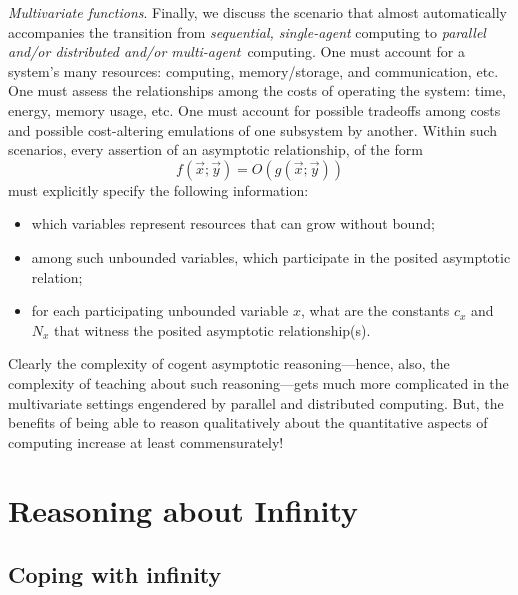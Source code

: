 {\em Multivariate functions}.
Finally, we discuss the scenario that almost automatically accompanies the transition from {\em sequential, single-agent} computing to {\em parallel and/or distributed and/or multi-agent}~computing.  One must account for a system's many resources: computing, memory/storage, and communication, etc.  One must assess the relationships among the costs of operating the system: time, energy, memory usage, etc.  One must account for possible tradeoffs among costs and possible cost-altering emulations of one subsystem by another. Within such scenarios, every assertion of an asymptotic relationship, of the form
\[ f(\vec{x}; \vec{y}) = O(g(\vec{x}; \vec{y})) \]
must explicitly specify the following information:
\begin{itemize}
\item
which variables represent resources that can grow without bound;
\medskip\item
among such unbounded variables, which participate in the posited asymptotic relation;
\medskip\item
for each participating unbounded variable $x$, what are the constants $c_x$ and $N_x$ that witness the posited asymptotic relationship(s).
\end{itemize}

\medskip

Clearly the complexity of cogent asymptotic reasoning---hence, also, the complexity of teaching about such reasoning---gets much more complicated in the multivariate settings engendered by parallel and distributed computing.  But, the benefits of being able to reason qualitatively about the quantitative aspects of computing increase at least commensurately!

\section{Reasoning about Infinity}
\label{sec:reasoning-infinity}

\subsection{Coping with infinity}
\label{sec:coping-infinity}

